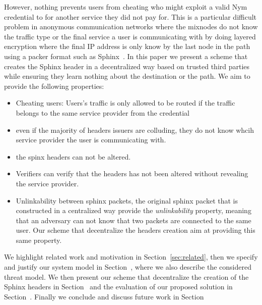 However, nothing prevents users from cheating who might exploit a valid Nym credential to for another service they did not pay for. This is a particular difficult problem in anonymous communication networks where the mixnodes do not know the traffic type or the final service a user is communicating with by doing layered encryption where the final IP address is only know by the last node in the path using a packer format such as Sphinx~\cite{sphinx}. 
\newline
In this paper we present a scheme that creates the Sphinx header in a decentralized way based on trusted third parties while ensuring they learn nothing about the destination or the path. We aim to provide the following properties:
\begin{itemize}
	\item Cheating users: Users's traffic is only allowed to be routed if the traffic belongs to the same service provider from the credential
	\item even if the majority of headers issuers are colluding, they do not know whcih service provider the user is communicating with.
	\item the spinx headers can not be altered.
	\item Verifiers can verify that the headers has not been altered without revealing the service provider.
	\item Unlinkability between  sphinx packets, the original sphinx packet that is constructed in a centralized way provide the \textit{unlinkability} property, meaning that an adversary can not know that two packets are connected to the same user. Our scheme that decentralize the headers creation aim at providing this same property.
\end{itemize}
We highlight related work and motivation in Section~\ref{sec:related}, then we specify and justify our system model in Section~\cite{sec:sys_model}, where we also describe the considered threat model. We then present our scheme that decentralize the creation of the Sphinx headers in Section~\cite{sec:scheme} and the evaluation of our proposed solution in Section~\cite{sec:eval}. Finally we conclude and discuss future work in Section~\cite{sec:conclusion}